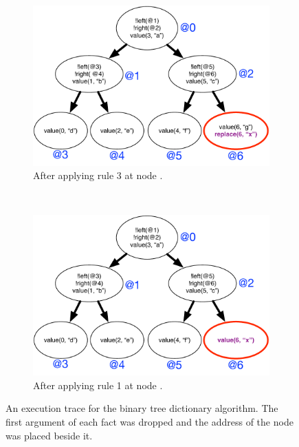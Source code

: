\begin{figure}[h]
\begin{subfigure}[b]{0.5\textwidth}
                \label{fig:language:btree_trace2}
        \end{subfigure}\\
        \begin{subfigure}[b]{0.5\textwidth}
                \includegraphics[width=\textwidth]{figures/btree/btree_trace3}
                \caption{After applying rule 3 at node .}
                \label{fig:language:btree_trace3}
        \end{subfigure}%
        ~
        \begin{subfigure}[b]{0.5\textwidth}
                  \includegraphics[width=\textwidth]{figures/btree/btree_trace4}
                  \caption{After applying rule 1 at node .}
                  \label{fig:language:btree_trace4}
          \end{subfigure}
        \caption{An execution trace for the binary tree dictionary
           algorithm. The first argument of each fact was dropped and the
           address of the node was placed beside it.}\label{fig:language:btree_trace}
\end{figure}

